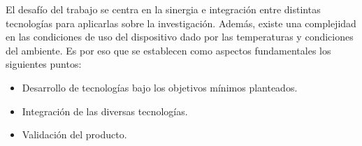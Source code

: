 El desafío del trabajo se centra en la sinergia e integración entre distintas tecnologías para aplicarlas sobre la investigación. Además, existe una complejidad en las condiciones de uso del dispositivo dado por las temperaturas y condiciones del ambiente. Es por eso que se establecen como aspectos fundamentales los siguientes puntos:
\begin{itemize}
	\item Desarrollo de tecnologías bajo los objetivos mínimos planteados.
	\item Integración de las diversas tecnologías.
	\item Validación del producto.
\end{itemize}

